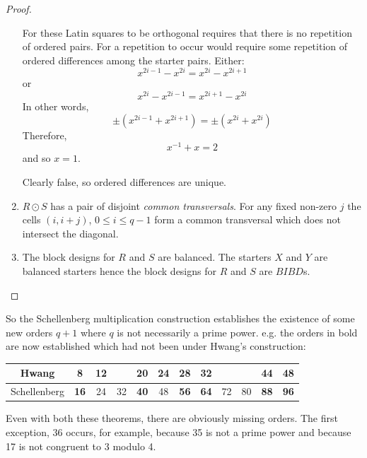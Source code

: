 \documentclass[11pt, a4paper]{book}\usepackage[]{graphicx}\usepackage[]{xcolor}
\newcounter{example}
\begin{document}
\begin{proof}
\begin{enumerate}
{      For these Latin
      squares to be orthogonal requires that there is no
      repetition of ordered pairs.  For a repetition to
      occur would require some repetition of ordered
      differences among the starter pairs.  Either:
      \begin{equation}
        x^{2i - 1} - x^{2i} = x^{2i} - x^{2i + 1}
      \end{equation}
      or
      \begin{equation}
        x^{2i} - x^{2i-1} = x^{2i+1} - x^{2i}
      \end{equation}
      In other words,
      \begin{equation}
       \pm (x^{2i - 1} + x^{2i + 1}) = \pm (x^{2i} + x^{2i})
      \end{equation}
      Therefore,
      \begin{equation}
        x^{-1} + x = 2
      \end{equation}
      and so $x = 1$.

      Clearly false, so ordered differences are unique.}
  \item{$R \odot S$ has a pair of disjoint \emph{common transversals}.
      For any fixed non-zero $j$ the cells
      $(i, i + j)$, $0 \leq i \leq q - 1$ form a common
      transversal which does not intersect the diagonal.}
  \item{The block designs for $R$ and $S$ are balanced. The
      starters $X$ and $Y$ are balanced starters hence the
      block designs for $R$ and $S$ are $BIBD$s.}
  \end{enumerate}
\end{proof}

So the Schellenberg multiplication construction establishes
the existence of some new orders $q + 1$ where $q$ is not
necessarily a prime power.  e.g.  the orders in bold are now
established which had not been under Hwang’s construction:

\begin{center}
  \begin{tabular}{|c|c|c|c|c|c|c|c|c|c|c|c|}
  \hline
     Hwang     &  8 & 12 &    & 20 & 24 & 28 & 32 &    &    & 44 & 48 \\ \hline
  Schellenberg & \textbf{16} & 24 & 32 & \textbf{40} & 48 & \textbf{56} & \textbf{64} & 72 & 80 & \textbf{88} & \textbf{96} \\ \hline
  \end{tabular}
\end{center}

Even with both these theorems, there are obviously missing
orders. The first exception, 36 occurs, for example, because
35 is not a prime power and because 17 is not congruent to
3 modulo 4.
\end{document}
